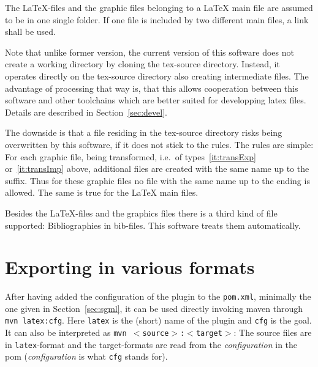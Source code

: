 \documentclass[12pt]{book}
\begin{document}
The \LaTeX-files and the graphic files belonging to a \LaTeX{} main file 
are assumed to be in one single folder. 
If one file is included by two different main files, 
a link shall be used.

Note that unlike former version, 
the current version of this software does not create a working directory 
by cloning the tex-source directory. 
Instead, it operates directly on the tex-source directory 
also creating intermediate files.
The advantage of processing that way is,
that this allows cooperation between this software
and other toolchains which are better suited for developping latex files.
Details are described in Section~\ref{sec:devel}.

The downside is that a file residing in the tex-source directory 
risks being overwritten by this software, 
if it does not stick to the rules. 
The rules are simple: 
For each graphic file, being transformed, 
i.e.~of types~\ref{it:transExp} or~\ref{it:transImp} above, 
additional files are created with the same name up to the suffix. 
Thus for these graphic files no file with the same name 
up to the ending is allowed. 
The same is true for the \LaTeX{} main files.

Besides the \LaTeX-files and the graphics files
there is a third kind of file supported:
Bibliographies in bib-files.
This software treats them automatically. 


\section{Exporting in various formats}\label{sec:stableUsage}


After having added the configuration of the plugin to the \texttt{pom.xml},
minimally the one given in Section~\ref{sec:sgml},
it can be used directly invoking maven through 
\texttt{mvn latex:cfg}. 
Here \texttt{latex} is the (short) name of the plugin 
and \texttt{cfg} is the goal. 
It can also be interpreted as \texttt{mvn $<$source$>$:$<$target$>$}: 
The source files are in \texttt{latex}-format and the target-formats 
are read from the {\em configuration\/} in the pom 
({\em configuration\/} is what \texttt{cfg} stands for). 
\end{document}
